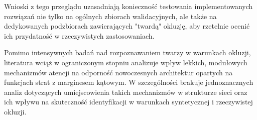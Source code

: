 Wnioski z tego przeglądu uzasadniają konieczność testowania implementowanych rozwiązań nie tylko na ogólnych zbiorach walidacyjnych, ale także na dedykowanych podzbiorach zawierających "twardą" okluzję, aby rzetelnie ocenić ich przydatność w rzeczywistych zastosowaniach.

Pomimo intensywnych badań nad rozpoznawaniem twarzy w warunkach okluzji, literatura wciąż w ograniczonym stopniu analizuje wpływ lekkich, modułowych mechanizmów atencji na odporność nowoczesnych architektur opartych na funkcjach strat z marginesem kątowym. W szczególności brakuje jednoznacznych analiz dotyczących umiejscowienia takich mechanizmów w strukturze sieci oraz ich wpływu na skuteczność identyfikacji w warunkach syntetycznej i rzeczywistej okluzji.
